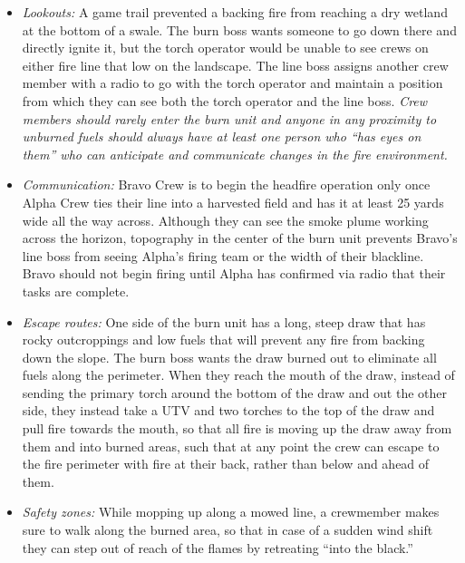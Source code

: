 	\begin{itemize}[noitemsep]	
	\item \textit{Lookouts:} A game trail prevented a backing fire from reaching a dry wetland at the bottom of a swale. 
	The burn boss wants someone to go down there and directly ignite it, but the torch operator would be unable to see crews on either fire line that low on the landscape. 
	The line boss assigns another crew member with a radio to go with the torch operator and maintain a position from which they can see both the torch operator and the line boss. 
	\emph{Crew members should rarely enter the burn unit and anyone in any proximity to unburned fuels should always have at least one person who ``has eyes on them'' who can anticipate and communicate changes in the fire environment.}
	\item \textit{Communication:} Bravo Crew is to begin the headfire operation only once Alpha Crew ties their line into a harvested field and has it at least 25 yards wide all the way across. 
	Although they can see the smoke plume working across the horizon, topography in the center of the burn unit prevents Bravo's line boss from seeing Alpha's firing team or the width of their blackline. 
	Bravo should not begin firing until Alpha has confirmed via radio that their tasks are complete. 
	\item \textit{Escape routes:} One side of the burn unit has a long, steep draw that has rocky outcroppings and low fuels that will prevent any fire from backing down the slope. 
	The burn boss wants the draw burned out to eliminate all fuels along the perimeter. 
	When they reach the mouth of the draw, instead of sending the primary torch around the bottom of the draw and out the other side, they instead take a UTV and two torches to the top of the draw and pull fire towards the mouth, so that all fire is moving up the draw away from them and into burned areas, such that at any point the crew can escape to the fire perimeter with fire at their back, rather than below and ahead of them. 
	\item \textit{Safety zones:} While mopping up along a mowed line, a crewmember makes sure to walk along the burned area, so that in case of a sudden wind shift they can step out of reach of the flames by retreating ``into the black.''
\end{itemize}

